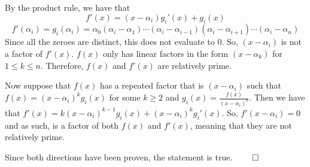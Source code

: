 \documentclass[12pt]{report}
\begin{document}
\begin{enumerate}[label=\alph*.]
    By the product rule, we have that 
    $$f'(x) = (x - \alpha_i)g_i'(x) + g_i(x)$$
    $$f'(\alpha_i) = g_i(\alpha_i) = \alpha_0(\alpha_i - \alpha_1) \cdots (\alpha_i - \alpha_{i-1})(\alpha_i - \alpha_{i+1})\cdots(\alpha_i - \alpha_n)$$
    Since all the zeroes are distinct, this does not evaluate to 0. So, $(x-\alpha_i)$ is not a factor of $f'(x)$. $f(x)$ only has linear factors in the form $(x-\alpha_k)$ for $1 \leq k \leq n$. Therefore, $f(x)$ and $f'(x)$ are relatively prime.

    Now suppose that $f(x)$ has a repeated factor that is $(x -\alpha_i)$ such that $f(x) = (x  - \alpha_i)^kg_i(x)$ for some $k \geq 2$ and $\displaystyle g_i(x) = \frac{f(x)}{(x - \alpha_i)^k}$. Then we have that $f'(x) = k(x - \alpha_i)^{k-1}g_i(x) + (x - \alpha_i)^kg_i'(x)$. So, $f'(x-\alpha_i) = 0$ and as such, is a factor of both $f(x)$ and $f'(x)$, meaning that they are not relatively prime.

    Since both directions have been proven, the statement is true. $\qed$
\end{enumerate}
\end{document}
